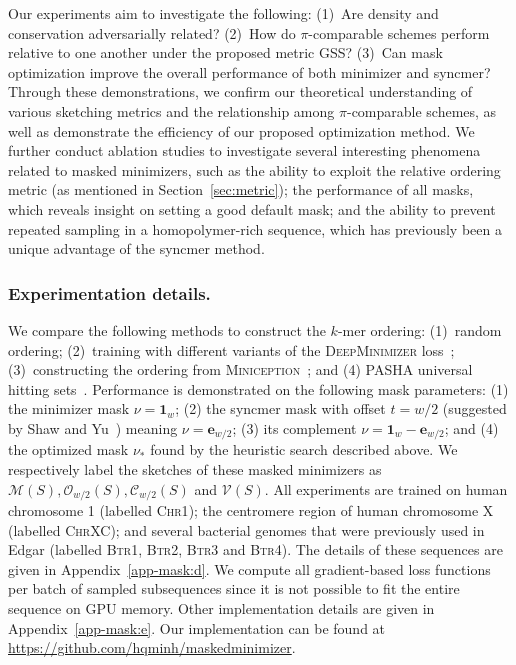 \label{sec:result}
Our experiments aim to investigate the following: (1)~Are density and conservation adversarially related? (2)~How do $\pi$-comparable schemes perform relative to one another under the proposed metric GSS? (3)~Can mask optimization improve the overall performance of both minimizer and syncmer? Through these demonstrations, we confirm our theoretical understanding of various sketching metrics and the relationship among $\pi$-comparable schemes, as well as demonstrate the efficiency of our proposed optimization method. We further conduct ablation studies to investigate several interesting phenomena related to masked minimizers, such as the ability to exploit the relative ordering metric (as mentioned in Section~\ref{sec:metric}); the performance of all masks, which reveals insight on setting a good default mask; and the ability to prevent repeated sampling in a homopolymer-rich sequence, which has previously been a unique advantage of the syncmer method.

\subsubsection{Experimentation details.}  
We compare the following methods to construct the $k$-mer ordering: (1)~random ordering; (2)~training with different variants of the \textsc{DeepMinimizer} loss~\cite{hoang2022deepminimizer}; (3)~constructing the ordering from \textsc{Miniception}~\cite{zheng20miniception}; and (4) \textsc{PASHA} universal hitting sets~\cite{ekim20pasha}. Performance is demonstrated on the following mask parameters: (1) the minimizer mask $\nu = \mathbf{1}_w$; (2) the syncmer mask with offset $t=w/2$ (suggested by Shaw and Yu~\cite{shaw2021theory}) meaning $\nu = \mathbf{e}_{w/2}$; (3) its complement $\nu=\mathbf{1}_w - \mathbf{e}_{w/2}$; and (4) the optimized mask $\nu_\ast$ found by the heuristic search described above. We respectively label the sketches of these masked minimizers as $\mathcal{M}(S),\mathcal{O}_{w/2}(S),\mathcal{C}_{w/2}(S)$ and $\mathcal{V}(S)$. All experiments are trained on human chromosome 1 (labelled \textsc{Chr1}); the centromere region of human chromosome X (labelled \textsc{ChrXC}); and several bacterial genomes that were previously used in Edgar \cite{edgar2021syncmers} (labelled \textsc{Btr1}, \textsc{Btr2}, \textsc{Btr3} and \textsc{Btr4}). The details of these sequences are given in Appendix~\ref{app-mask:d}.
We compute all gradient-based loss functions per batch of sampled subsequences since it is not possible to fit the entire sequence on GPU memory. Other implementation details are given in Appendix~\ref{app-mask:e}. Our implementation can be found at \url{https://github.com/hqminh/maskedminimizer}.
